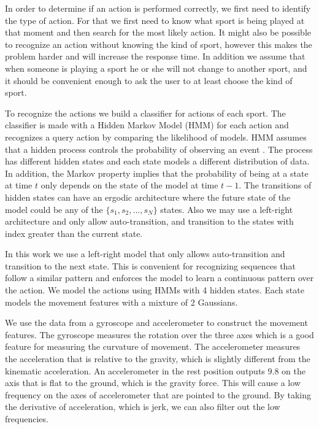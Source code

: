 In order to determine if an action is performed correctly, we first need to identify the type of action. For that we first need to know what sport is being played at that moment and then search for the most likely action. It might also be possible to recognize an action without knowing the kind of sport, however this makes the problem harder and will increase the response time. In addition we assume that when someone is playing a sport he or she will not change to another sport, and it should be convenient enough to ask the user to at least choose the kind of sport.

To recognize the actions we build a classifier for actions of each sport. The classifier is made with a Hidden Markov Model (HMM) for each action and recognizes a query action by comparing the likelihood of models. HMM assumes that a hidden process controls the probability of observing an event \cite{rabiner1986introduction}. The process has different hidden states and each state models a different distribution of data. In addition, the Markov property implies that the probability of being at a state at time $t$ only depends on the state of the model at time $t-1$. The transitions of hidden states can have an ergodic architecture where the future state of the model could be any of the $\{s_1,s_2,...,s_N\}$ states. Also we may use a left-right architecture and only allow auto-transition, and transition to the states with index greater than the current state.

In this work we use a left-right model that only allows auto-transition and transition to the next state. This is convenient for recognizing sequences that follow a similar pattern and enforces the model to learn a continuous pattern over the action. We model the actions using HMMs with 4 hidden states. Each state models the movement features with a mixture of 2 Gaussians.

We use the data from a gyroscope and accelerometer to construct the movement features. The gyroscope measures the rotation over the three axes which is a good feature for measuring the curvature of movement. The accelerometer measures the acceleration that is relative to the gravity, which is slightly different from the kinematic acceleration. An accelerometer in the rest position outputs $9.8$ on the axis that is flat to the ground, which is the gravity force. This will cause a low frequency on the axes of accelerometer that are pointed to the ground. By taking the derivative of acceleration, which is jerk, we can also filter out the low frequencies.


